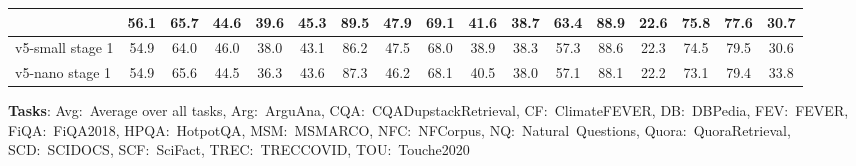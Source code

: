 \documentclass[11pt]{article}
\begin{document}
\begin{table}[H]
\begin{tabular}{l*{16}{c}}
\JEmbeddingVFiveTextNanoShort{} & \textbf{56.1} & 65.7 & 44.6 & \textbf{39.6} & \textbf{45.3} & \textbf{89.5} & 47.9 & 69.1 & \textbf{41.6} & 38.7 & 63.4 & 88.9 & \textbf{22.6} & 75.8 & 77.6 & \textbf{30.7} \\
\midrule
v5-small stage 1 & 54.9 & 64.0 & 46.0 & 38.0 & 43.1 & 86.2 & 47.5 & 68.0 & 38.9 & 38.3 & 57.3 & 88.6 & 22.3 & 74.5 & 79.5 & 30.6 \\
v5-nano stage 1 & 54.9 & 65.6 & 44.5 & 36.3 & 43.6 & 87.3 & 46.2 & 68.1 & 40.5 & 38.0 & 57.1 & 88.1 & 22.2 & 73.1 & 79.4 & 33.8 \\
\bottomrule
\end{tabular}
\begin{flushleft}
    \textbf{Tasks}:  Avg:~Average over all tasks, Arg:~ArguAna, CQA:~CQADupstackRetrieval, CF:~ClimateFEVER, DB:~DBPedia, FEV:~FEVER, FiQA:~FiQA2018, HPQA:~HotpotQA, MSM:~MSMARCO, NFC:~NFCorpus, NQ:~Natural~Questions, Quora:~QuoraRetrieval, SCD:~SCIDOCS, SCF:~SciFact, TREC:~TRECCOVID, TOU:~Touche2020
\end{flushleft}
\end{table}
\end{document}
